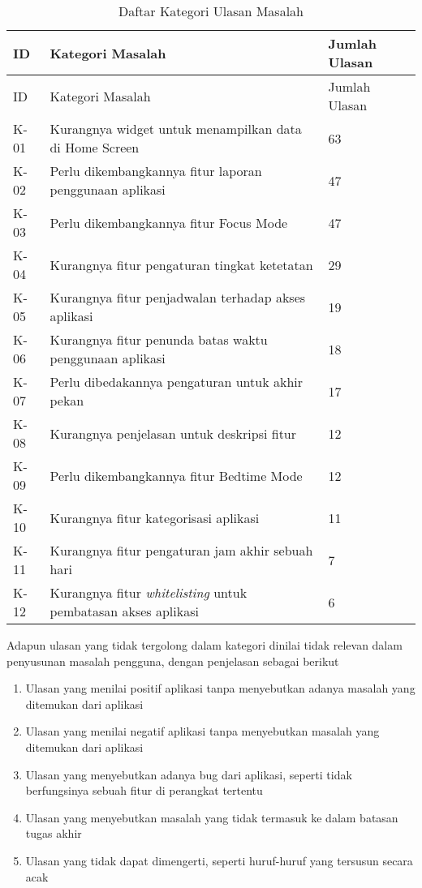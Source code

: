 \begin{longtable}[c]{|p{}|p{}|p{}|}
  \caption{Daftar Kategori Ulasan Masalah}
  \label{tab:daftar_kategori} \\
  \hline ID & Kategori Masalah & Jumlah Ulasan \\ \hline \endfirsthead
  \hline ID & Kategori Masalah & Jumlah Ulasan \\ \hline \endhead

  \hline \endfoot

  K-01    & Kurangnya widget untuk menampilkan data di Home Screen & 63 \\ \hline
  K-02    & Perlu dikembangkannya fitur laporan penggunaan aplikasi & 47 \\ \hline
  K-03    & Perlu dikembangkannya fitur Focus Mode & 47 \\ \hline
  K-04    & Kurangnya fitur pengaturan tingkat ketetatan & 29 \\ \hline
  K-05    & Kurangnya fitur penjadwalan terhadap akses aplikasi & 19 \\ \hline
  K-06    & Kurangnya fitur penunda batas waktu penggunaan aplikasi & 18 \\ \hline
  K-07    & Perlu dibedakannya pengaturan untuk akhir pekan & 17 \\ \hline
  K-08    & Kurangnya penjelasan untuk deskripsi fitur & 12 \\ \hline
  K-09    & Perlu dikembangkannya fitur Bedtime Mode & 12 \\ \hline
  K-10    & Kurangnya fitur kategorisasi aplikasi & 11 \\ \hline
  K-11    & Kurangnya fitur pengaturan jam akhir sebuah hari & 7 \\ \hline
  K-12    & Kurangnya fitur \textit{whitelisting} untuk pembatasan akses aplikasi & 6 \\ \hline
\end{longtable}

\FloatBarrier

Adapun ulasan yang tidak tergolong dalam kategori dinilai tidak relevan dalam penyusunan masalah pengguna, dengan penjelasan sebagai berikut

\begin{enumerate}
  \item Ulasan yang menilai positif aplikasi tanpa menyebutkan adanya masalah yang ditemukan dari aplikasi
  \item Ulasan yang menilai negatif aplikasi tanpa menyebutkan masalah yang ditemukan dari aplikasi
  \item Ulasan yang menyebutkan adanya bug dari aplikasi, seperti tidak berfungsinya sebuah fitur di perangkat tertentu
  \item Ulasan yang menyebutkan masalah yang tidak termasuk ke dalam batasan tugas akhir
  \item Ulasan yang tidak dapat dimengerti, seperti huruf-huruf yang tersusun secara acak 
\end{enumerate}

